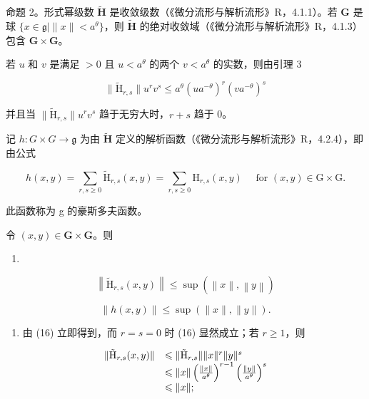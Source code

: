 命题 2。形式幂级数 \(\tilde{\mathbf{H}}\) 是收敛级数（《微分流形与解析流形》R，4.1.1）。若 \(\mathbf{G}\) 是球 \(\{x\in\mathfrak{g}\mid\|x\|<a^{\theta}\}\)，则 \(\tilde{\mathbf{H}}\) 的绝对收敛域（《微分流形与解析流形》R，4.1.3）包含 \(\mathbf{G}\times\mathbf{G}\)。

若 \(u\) 和 \(v\) 是满足 \(>0\) 且 \(u < a^{\theta}\) 的两个 \(v < a^{\theta}\) 的实数，则由引理 3

\[
\| \tilde {\mathrm{H}} _ {r, s} \| u ^ {r} v ^ {s} \leqslant a ^ {\theta} (u a ^ {- \theta}) ^ {r} (v a ^ {- \theta}) ^ {s}\tag{14}
\]

并且当 \(\| \tilde{\mathrm{H}}_{r,s}\| u^r v^s\) 趋于无穷大时，\(r + s\) 趋于 0。

记 \(h \colon G \times G \to \mathfrak{g}\) 为由 \(\tilde{\mathbf{H}}\) 定义的解析函数（《微分流形与解析流形》R，4.2.4），即由公式

\[
h (x, y) = \sum_ {r, s \geqslant 0} \tilde {\mathrm{H}} _ {r, s} (x, y) = \sum_ {r, s \geqslant 0} \mathrm{H} _ {r, s} (x, y) \quad \text { for } (x, y) \in \mathrm{G} \times \mathrm{G}.\tag{15}
\]

此函数称为 g 的豪斯多夫函数。

令 \((x,y)\in \mathbf{G}\times \mathbf{G}\)。则

\begin{enumerate}
\def\labelenumi{(\arabic{enumi})}
\setcounter{enumi}{15}
\tightlist
\item
\end{enumerate}

\[
\left\| \tilde {\mathrm{H}} _ {r, s} (x, y) \right\| \leqslant \sup (\left\| x \right\|, \left\| y \right\|)\tag{16}
\]

\[
\| h (x, y) \| \leqslant \sup (\| x \|, \| y \|).\tag{17}
\]

\begin{enumerate}
\def\labelenumi{(\arabic{enumi})}
\setcounter{enumi}{16}
\tightlist
\item
  由 (16) 立即得到，而 \(r = s = 0\) 时 (16) 显然成立；若 \(r \geqslant 1\)，则
\end{enumerate}

\[
\begin{array}{r l} \| \tilde {\mathrm{H}} _ {r, s} (x, y) \| & \leqslant \| \tilde {\mathrm{H}} _ {r, s} \| \| x \| ^ {r} \| y \| ^ {s} \\ & \leqslant \| x \| \left(\frac {\| x \|}{a ^ {\theta}}\right) ^ {r - 1} \left(\frac {\| y \|}{a ^ {\theta}}\right) ^ {s} \\ & \leqslant \| x \|; \end{array}
\]

